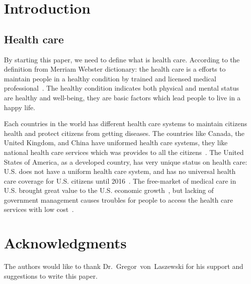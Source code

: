 \section{Introduction}
\subsection{Health care}
By starting this paper, we need to define what is health care. According to the definition from Merriam Webster dictionary: the health care is a efforts to maintain people in a healthy condition by trained and licensed medical professional~\cite{def_hc}. The healthy condition indicates both physical and mental status are healthy and well-being, they are basic factors which lead people to live in a happy life. 

Each countries in the world has different health care systems to maintain citizens health and protect citizens from getting diseases. The countries like Canada, the United Kingdom, and China have uniformed health care systems, they like national health care services which was provides to all the citizens~\cite{ca_hc, uk_hc, cn_hc}. The United States of America, as a developed country, has very unique status on health care: U.S. does not have a uniform health care system, and has no universal health care coverage for U.S. citizens until 2016~\cite{us_hc}. The free-market of medical care in U.S. brought great value to the U.S. economic growth~\cite{us_hccost}, but lacking of government management causes troubles for people to access the health care services with low cost~\cite{us_hcs}.

\section{Acknowledgments}
\begin{acks}

  The authors would like to thank Dr.~Gregor~von~Laszewski for his
  support and suggestions to write this paper.

\end{acks}


 

